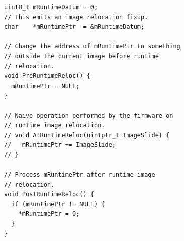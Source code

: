 
\begin{lstfloat}[ht]
  \centering
  \begin{lstlisting}[style=c]
uint8_t mRuntimeDatum = 0;
// This emits an image relocation fixup.
char    *mRuntimePtr  = &mRuntimeDatum;

// Change the address of mRuntimePtr to something
// outside the current image before runtime
// relocation.
void PreRuntimeReloc() {
  mRuntimePtr = NULL;
}

// Naive operation performed by the firmware on
// runtime image relocation.
// void AtRuntimeReloc(uintptr_t ImageSlide) {
//   mRuntimePtr += ImageSlide;
// }

// Process mRuntimePtr after runtime image
// relocation.
void PostRuntimeReloc() {
  if (mRuntimePtr != NULL) {
    *mRuntimePtr = 0;
  }
}
  \end{lstlisting}
  \caption{Fault from Naive UEFI Runtime Image Relocation.}
  \label{fig:native_uefi_rt_reloc}
  \caption*{Faulting program assuming naive \gls{UEFI} \gls{runtime-image-relocation}. This strictly assumes the \gls{UEFI} specification's description of \lstinline|SetVirtualAddressMap()|~\cite{uefi-spec}. As \lstinline|mRuntimePtr| is initialized with the absolute address of a global variable, an \gls{image-relocation-fixup} is emitted for it~(see Section~\ref{sec:reloc}). Before entering the runtime phase, we set the pointer to \lstinline[style=c]|NULL|. Due to the recorded \gls{image-relocation-fixup} for the previous address, \lstinline[style=c]|NULL| is relocated, and the final value is exactly \lstinline|ImageSlide = NewBase - OldBase|, i.e. a rogue pointer. After the \gls{runtime-image-relocation} has succeeded, we run some code that changes the value of \lstinline|mRuntimePtr| if and only if it is not \lstinline|NULL|, a common way to signal pointer liveness. At this point, we corrupt arbitrary memory, even though the code is semantically correct.}
\end{lstfloat}

